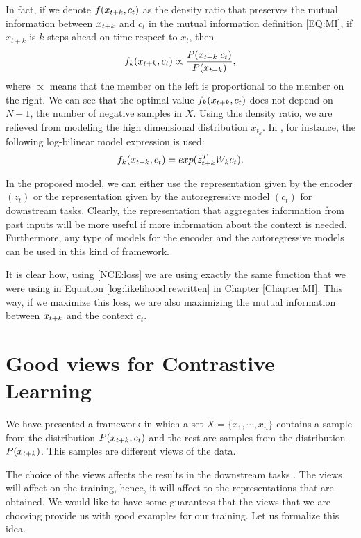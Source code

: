 In fact, if we denote $f(x_{t+k},c_t)$  as the density ratio that preserves the mutual information between $x_{t+k}$ and $c_t$ in the mutual information definition \eqref{EQ:MI}, if $x_{t+k}$ is $k$ steps ahead on time respect to $x_t$, then
\begin{equation}\label{EQ:Proportional}
f_k(x_{t+k},c_t)  \propto \frac{P(x_{t+k}| c_t)}{P(x_{t+k})},
\end{equation}
where $\propto$ means that the member on the left is proportional to the member on the right. We can see that the optimal value $f_k(x_{t+k},c_t)$ does not depend on $N-1$, the number of negative samples in $X$.
Using this density ratio, we are relieved from modeling the high dimensional distribution $x_{t_k}$. In \cite{oord_representation_2019}, for instance, the following log-bilinear model expression is used:
$$
f_k(x_{t+k},c_t) = exp(z_{t+k}^T W_k c_t).
$$


In the proposed model, we can either use the representation given by the encoder $(z_t)$ or the representation given by the autoregressive model $(c_t)$ for downstream tasks. Clearly, the representation that aggregates information from past inputs will be more useful
if more information about the context is needed. Furthermore, any type of models for the encoder and the autoregressive models can be used in this kind of framework.

It is clear how, using \eqref{NCE:loss} we are using exactly the same function that we were using in Equation \ref{log:likelihood:rewritten} in Chapter \ref{Chapter:MI}. This way, if we maximize this loss, we are also maximizing the mutual information between $x_{t+k}$ and the context $c_t$.

\section{Good views for Contrastive Learning}

We have presented a framework in which a set $X = \{x_1,\cdots,x_n\}$ contains a sample from the distribution $P(x_{t+k},c_t)$ and the rest are samples from the distribution $P(x_{t+k})$. This samples are different views of the data. 

The choice of the views affects the results in the downstream tasks \citep{tian_what_2020}. The views will affect on the training, hence, it will affect to the representations that are obtained. We would like to have some guarantees that the views that we are choosing provide us with good examples for our training. Let us formalize this idea.

